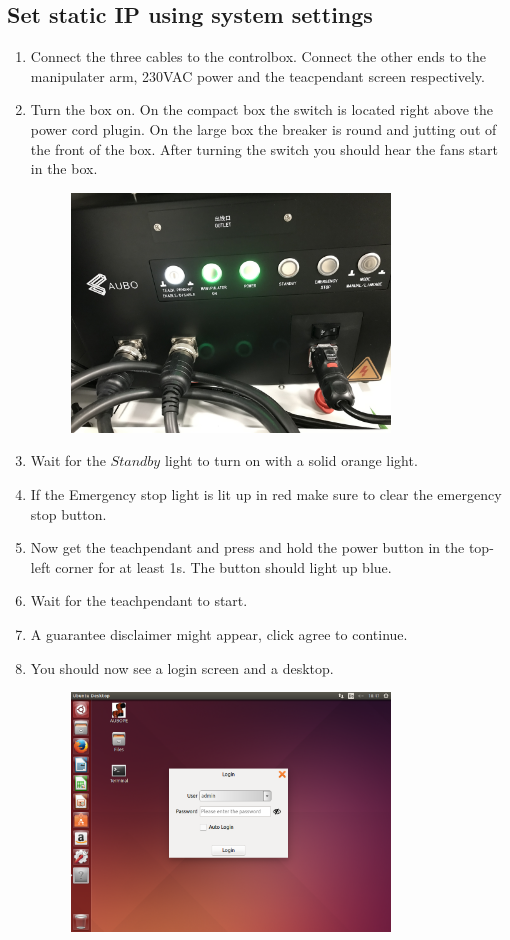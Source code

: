\documentclass{article}
\begin{document}
\subsection{Set static IP using system settings} \label{subsec:statIPsysSett}
\begin{enumerate}
\item Connect the three cables to the controlbox. Connect the other ends to the manipulater arm, 230VAC power and the teacpendant screen respectively.
\item Turn the box on. On the compact box the switch is located right above the power cord plugin. On the large box the breaker is round and jutting out of the front of the box. After turning the switch you should hear the fans start in the box.
\begin{figure}[H]\centering
\includegraphics[width=0.8\textwidth]{../../Images/FrontCompactAuboBox.jpg}
\end{figure}
\item Wait for the $Standby$ light to turn on with a solid orange light. 
\item If the Emergency stop light is lit up in red make sure to clear the emergency stop button.
\item Now get the teachpendant and press and hold the power button in the top-left corner for at least 1s. The button should light up blue.
\item Wait for the teachpendant to start. 
\item A guarantee disclaimer might appear, click agree to continue. 
\item You should now see a login screen and a desktop. 
\begin{figure}[H]\centering
\includegraphics[width=0.8\textwidth]{../../Images/loginScreen.png}

\end{figure}
\end{enumerate}
\end{document}
